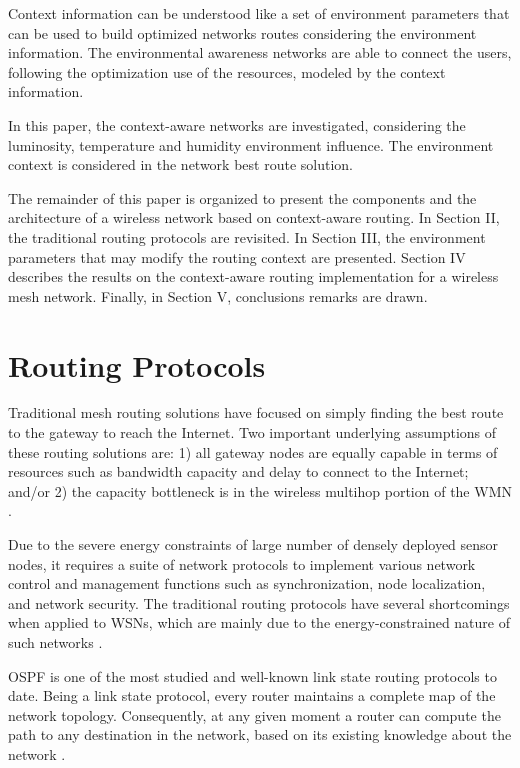 \documentclass[conference]{IEEEtran}
\begin{document}
Context information can be understood like a set of environment parameters that can be used to build optimized networks routes considering the environment information. The environmental awareness networks are able to connect the users, following the optimization use of the resources, modeled by the context information.

In this paper, the context-aware networks are investigated, considering the luminosity, temperature and humidity environment influence. The environment context is considered in the network best route solution.

The remainder of this paper is organized to present the components and the architecture of a wireless network based on context-aware routing. In Section II, the traditional routing protocols are revisited. In Section III, the environment parameters that may modify the routing context are presented. Section IV describes the results on the context-aware routing implementation for a wireless mesh network. Finally, in Section V, conclusions remarks are drawn.


\section{Routing Protocols}
Traditional mesh routing solutions have focused on simply finding the best route to the gateway to reach the Internet. Two important underlying assumptions of these routing solutions are: 1) all gateway nodes are equally capable in terms of resources such as bandwidth capacity and delay to connect to the Internet; and/or 2) the capacity bottleneck is in the wireless multihop portion of the WMN \cite{Prashanth2015}.

Due to the severe energy constraints of large number of densely deployed sensor nodes, it requires a suite of network protocols to implement various network control and management functions such as synchronization, node localization, and network security. The traditional routing protocols have several shortcomings when applied to WSNs, which are mainly due to the energy-constrained nature of such networks \cite{Shio2010}.

OSPF is one of the most studied and well-known link state routing protocols to date. Being a link state protocol, every router maintains a complete map of the network topology. Consequently, at any given moment a router can compute the path to any destination in the network, based on its existing knowledge about the network \cite{Holter2010}.
\end{document}
